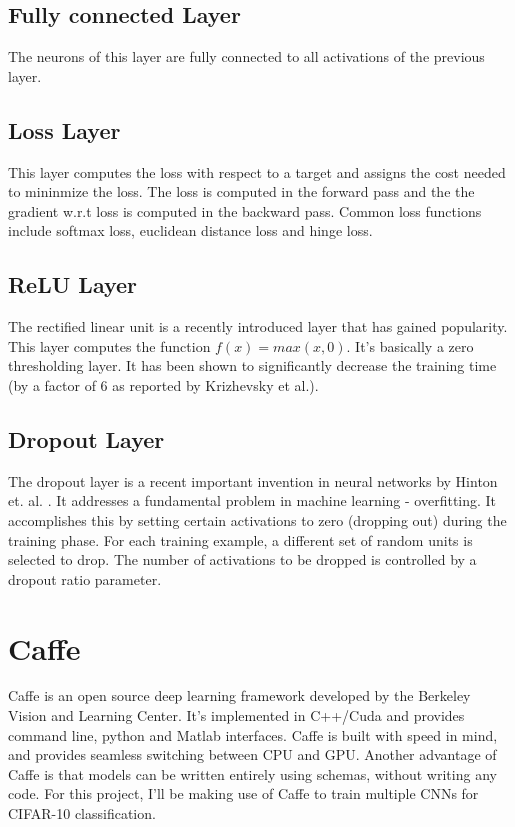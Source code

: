 \documentclass[10pt,twocolumn,letterpaper]{article}
\begin{document}
\subsection{Fully connected Layer}
The neurons of this layer are fully connected to all activations of the previous layer.

\subsection{Loss Layer}
This layer computes the loss with respect to a target and assigns the cost needed to mininmize the loss. The loss is computed in the forward pass and the the gradient w.r.t loss is computed in the backward pass. Common loss functions include softmax loss, euclidean distance loss and hinge loss.

\subsection{ReLU Layer}
The rectified linear unit is a recently introduced layer that has gained popularity. This layer computes the function $f(x) = max(x,0)$. It's basically a zero thresholding layer. It has been shown to significantly decrease the training time (by a factor of 6 as reported by Krizhevsky et al.).

\subsection{Dropout Layer}
The dropout layer is a recent important invention in neural networks by Hinton et. al. \cite{hinton2012improving}. It addresses a fundamental problem in machine learning - overfitting. It accomplishes this by setting certain activations to zero (dropping out) during the training phase. For each training example, a different set of random units is selected to drop. The number of activations to be dropped is controlled by a dropout ratio parameter.




\section{Caffe}
Caffe is an open source deep learning framework developed by the Berkeley Vision and Learning Center. It's implemented in C++/Cuda and provides command line, python and Matlab interfaces. Caffe is built with speed in mind, and provides seamless switching between CPU and GPU. Another advantage of Caffe is that models can be written entirely using schemas, without writing any code. For this project, I'll be making use of Caffe to train multiple CNNs for CIFAR-10 classification.
\end{document}
